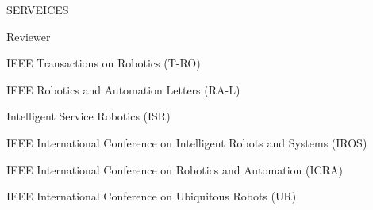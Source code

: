 \begin{rSection}{SERVEICES}{}{}{}        
    \begin{rSubsection}{Reviewer}{}{}{}   
        \item IEEE Transactions on Robotics (T-RO) 
        \item IEEE Robotics and Automation Letters (RA-L)        
        \item Intelligent Service Robotics (ISR)             
        \item IEEE International Conference on Intelligent Robots and Systems (IROS)
        \item IEEE International Conference on Robotics and Automation (ICRA)                
        \item IEEE International Conference on Ubiquitous Robots (UR)
        
     \end{rSubsection}  
 \end{rSection}

